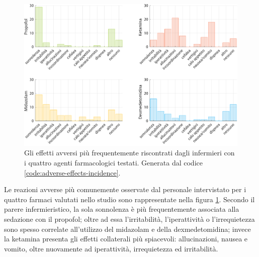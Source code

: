 \vfill


\begin{figure}[!h]
    \centering
    \includegraphics[width=1\textwidth]{Figure/effetti-avversi.pdf}
    \caption{Gli effetti avversi più frequentemente riscontrati dagli infermieri con i quattro agenti farmacologici testati. Generata dal codice \ref{code:adverse-effects-incidence}.}
    \label{fig:sicurezza}
\end{figure}

\vfill

Le reazioni avverse più comunemente osservate dal personale intervistato per i quattro farmaci valutati nello studio sono rappresentate nella figura \ref{fig:sicurezza}. Secondo il parere infermieristico, la sola sonnolenza è più frequentemente associata alla sedazione con il propofol; oltre ad essa l'irritabilità, l'iperattività o l'irrequietezza sono spesso correlate all'utilizzo del midazolam e della dexmedetomidina; invece la ketamina presenta gli effetti collaterali più spiacevoli: allucinazioni, nausea e vomito, oltre nuovamente ad iperattività, irrequietezza ed irritabilità.

